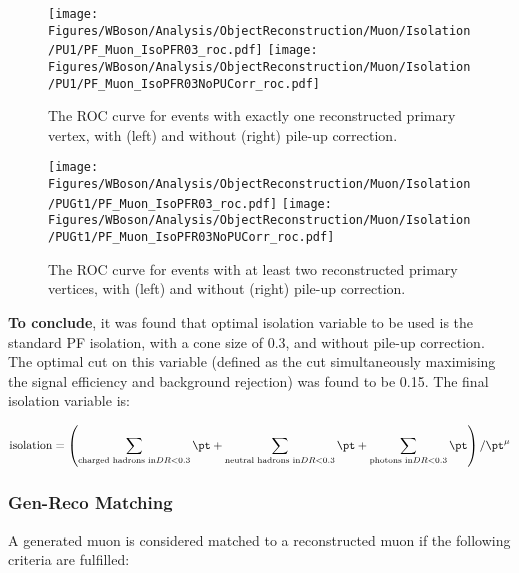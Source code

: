 \begin{figure}[!htbp]
  
 \texttt{[image: Figures/WBoson/Analysis/ObjectReconstruction/Muon/Isolation/PU1/PF\_Muon\_IsoPFR03\_roc.pdf]}
 \texttt{[image: Figures/WBoson/Analysis/ObjectReconstruction/Muon/Isolation/PU1/PF\_Muon\_IsoPFR03NoPUCorr\_roc.pdf]}
 
 \caption{\label{fig:isonoPU} The ROC curve for events with exactly one reconstructed primary vertex, with (left) and without (right) pile-up correction.}

\end{figure}

\begin{figure}[!htbp]
 
 \texttt{[image: Figures/WBoson/Analysis/ObjectReconstruction/Muon/Isolation/PUGt1/PF\_Muon\_IsoPFR03\_roc.pdf]}
 \texttt{[image: Figures/WBoson/Analysis/ObjectReconstruction/Muon/Isolation/PUGt1/PF\_Muon\_IsoPFR03NoPUCorr\_roc.pdf]}

 \caption{\label{fig:isoPU} The ROC curve for events with at least two reconstructed primary vertices, with (left) and without (right) pile-up correction.}
\end{figure}

\textbf{To conclude}, it was found that optimal isolation variable to be used is the standard PF isolation, with a cone size of 0.3, and without pile-up correction. The optimal cut on this variable 
(defined as the cut simultaneously maximising the signal efficiency and background rejection) was found to be 0.15. The final isolation variable is:

\begin{equation}
 \text{isolation} = \left(\sum_{\text{charged hadrons in} DR<0.3} \pt + \sum_{\text{neutral hadrons in} DR<0.3} \pt + \sum_{\text{photons in} DR<0.3} \pt\right) / \pt^\mu
\end{equation}



\subsubsection{Gen-Reco Matching} \label{sec:WBoson_Analysis_GenRecoMatching}

A generated muon is considered matched to a reconstructed muon if the following criteria are fulfilled:

